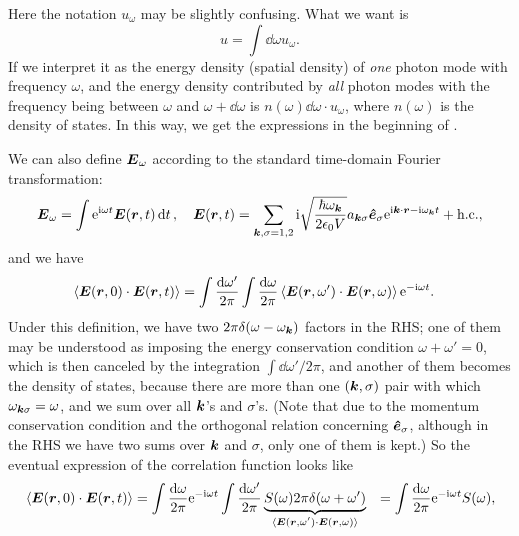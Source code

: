 \documentclass[hyperref, a4paper]{article}
\newcommand*{\ii}{\mathrm{i}}
\newcommand*{\ee}{\mathrm{e}}
\def\\{}%
\begin{document}
Here the notation $u_\omega$ may be slightly confusing.
What we want is 
\begin{equation}
    u = \int \dd{\omega} u_\omega.
\end{equation}
If we interpret it as 
the energy density (spatial density) of \emph{one} photon mode with frequency $\omega$, 
and the energy density contributed by \emph{all} photon modes 
with the frequency being between $\omega$ and $\omega + \dd{\omega}$
is $n(\omega) \dd{\omega} \cdot u_\omega$,
where $n(\omega)$ is the density of states. 
In this way, we get the expressions in the beginning of .

We can also define $\vb*{E}_\omega$ according to the standard 
time-domain Fourier transformation:
\begin{equation}
    \vb*{E}_{\omega} = \int \ee^{\ii \omega t} \vb*{E}(\vb*{r}, t) \dd{t} , \quad
    \vb*{E}(\vb*{r}, t) = \sum_{\vb*{k}, \sigma = 1, 2}
    \ii \sqrt{\frac{\hbar \omega_{\vb*{k}}}{2 \epsilon_0 V}} 
    a_{\vb*{k} \sigma} \vu*{e}_\sigma \ee^{\ii \vb*{k} \cdot \vb*{r} - \ii \omega_{\vb*{k}} t} + \text{h.c.},
\end{equation}
and we have 
\begin{equation}
    \begin{aligned}
        \expval*{\vb*{E}(\vb*{r}, 0) \cdot \vb*{E}(\vb*{r}, t)} &= 
        \int \frac{\dd{\omega'}}{2\pi} \int \frac{\dd{\omega}}{2\pi}
        \expval*{\vb*{E}(\vb*{r}, \omega') \cdot \vb*{E}(\vb*{r}, \omega)}
        \ee^{- \ii \omega t}.
    \end{aligned}
\end{equation}
Under this definition, 
we have two $2\pi \delta (\omega - \omega_{\vb*{k}})$ factors in the RHS;
one of them may be understood as imposing the energy conservation condition $\omega + \omega' = 0$,
which is then canceled by the integration $\int \dd{\omega'} / 2\pi$, 
and another of them becomes the density of states, 
because there are more than one $(\vb*{k}, \sigma)$ pair with which  
$\omega_{\vb*{k} \sigma} = \omega$, 
and we sum over all $\vb*{k}$'s and $\sigma$'s.
(Note that due to the momentum conservation condition 
and the orthogonal relation concerning $\vu*{e}_\sigma$,
although in the RHS we have two sums over $\vb*{k}$ and $\sigma$,
only one of them is kept.)
So the eventual expression of the correlation function looks like 
\begin{equation}
    \begin{aligned}
        \expval*{\vb*{E}(\vb*{r}, 0) \cdot \vb*{E}(\vb*{r}, t)}
        &= \int \frac{\dd{\omega}}{2\pi} \ee^{- \ii \omega t} \int \frac{\dd{\omega'}}{2\pi} 
        \underbrace{S({\omega}) 2\pi \delta(\omega + \omega') }_{
            \expval*{\vb*{E}(\vb*{r}, \omega') \cdot \vb*{E}(\vb*{r}, \omega)}
        } \\ 
        &= \int \frac{\dd{\omega}}{2\pi} \ee^{- \ii \omega t} S(\omega),
    \end{aligned}
\end{equation}
\end{document}
